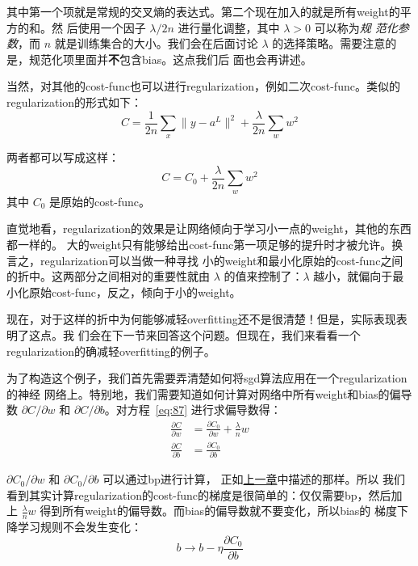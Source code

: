 其中第一个项就是常规的交叉熵的表达式。第二个现在加入的就是所有\gls*{weight}的平方的和。然
后使用一个因子 $\lambda / 2n$ 进行量化调整，其中 $\lambda > 0$ 可以称为\emph{规
  范化参数}，而 $n$ 就是训练集合的大小。我们会在后面讨论
$\lambda$ 的选择策略。需要注意的是，规范化项里面并\textbf{不}包含\gls*{bias}。这点我们后
面也会再讲述。

当然，对其他的\gls*{cost-func}也可以进行\gls*{regularization}，例如二次\gls*{cost-func}。类似的\gls*{regularization}的形式如下：
\begin{equation}
  C = \frac{1}{2n} \sum_x \|y-a^L\|^2 + \frac{\lambda}{2n} \sum_w w^2
  \label{eq:86}\tag{86}
\end{equation}

两者都可以写成这样：
\begin{equation}
  C = C_0 + \frac{\lambda}{2n} \sum_w w^2
  \label{eq:87}\tag{87}
\end{equation}
其中 $C_0$ 是原始的\gls*{cost-func}。

直觉地看，\gls*{regularization}的效果是让网络倾向于学习小一点的\gls*{weight}，其他的东西都一样的。
大的\gls*{weight}只有能够给出\gls*{cost-func}第一项足够的提升时才被允许。换言之，\gls*{regularization}可以当做一种寻找
小的\gls*{weight}和最小化原始的\gls*{cost-func}之间的折中。这两部分之间相对的重要性就由 $\lambda$
的值来控制了：$\lambda$ 越小，就偏向于最小化原始\gls*{cost-func}，反之，倾向于小的\gls*{weight}。

现在，对于这样的折中为何能够减轻\gls*{overfitting}还不是很清楚！但是，实际表现表明了这点。我
们会在下一节来回答这个问题。但现在，我们来看看一个\gls*{regularization}的确减轻\gls*{overfitting}的例子。

为了构造这个例子，我们首先需要弄清楚如何将\gls*{sgd}算法应用在一个\gls*{regularization}的神经
网络上。特别地，我们需要知道如何计算对网络中所有\gls*{weight}和\gls*{bias}的偏导数 $\partial
C/\partial w$ 和 $\partial C/\partial b$。对方程~\eqref{eq:87} 进行求偏导数得：
\begin{align}
  \frac{\partial C}{\partial w} & = \frac{\partial C_0}{\partial w} +
                                  \frac{\lambda}{n} w \label{eq:88}\tag{88} \\
  \frac{\partial C}{\partial b} & = \frac{\partial C_0}{\partial b} \label{eq:89}\tag{89}
\end{align}

$\partial C_0/\partial w$ 和 $\partial C_0/\partial b$ 可以通过\gls*{bp}进行计算，
正如\hyperref[ch:HowTheBackpropagationAlgorithmWorks]{上一章}中描述的那样。所以
我们看到其实计算\gls*{regularization}的\gls*{cost-func}的梯度是很简单的：仅仅需要\gls*{bp}，然后加上
$\frac{\lambda}{n} w$ 得到所有\gls*{weight}的偏导数。而\gls*{bias}的偏导数就不要变化，所以\gls*{bias}的
梯度下降学习规则不会发生变化：
\begin{equation}
  b \rightarrow b -\eta \frac{\partial C_0}{\partial b}
  \label{eq:90}\tag{90}
\end{equation}

